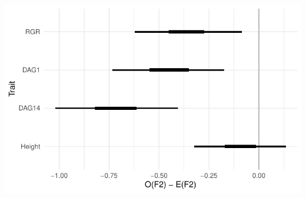 \documentclass[
  letterpaper,
  DIV=11,
  numbers=noendperiod]{scrartcl}
\begin{document}
\includegraphics{analysis_files/figure-pdf/unnamed-chunk-6-1.pdf}

\subsubsection{}\label{section}
\end{document}
